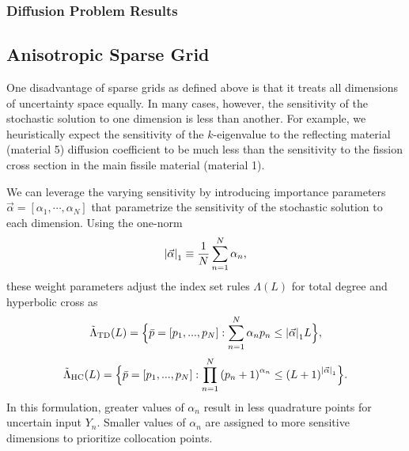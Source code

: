 \documentclass{mc2015}
\begin{document}
\subsubsection{Diffusion Problem Results}



\subsection{Anisotropic Sparse Grid}
One disadvantage of sparse grids as defined above is that it treats all dimensions of uncertainty space equally.  In many cases, however, the sensitivity of the stochastic solution to one dimension is less than another.  For example, we heuristically expect the sensitivity of the $k$-eigenvalue to the reflecting material (material 5) diffusion coefficient to be much less than the sensitivity to the fission cross section in the main fissile material (material 1).  

We can leverage the varying sensitivity by introducing importance parameters $\vec\alpha=[\alpha_1,\cdots,\alpha_N]$ that parametrize the sensitivity of the stochastic solution to each dimension.  Using the one-norm
\begin{equation}
\qty|\vec\alpha|_1\equiv\frac{1}{N}\sum_{n=1}^N \alpha_n,
\end{equation}
these weight parameters adjust the index set rules $\Lambda(L)$ for total degree and hyperbolic cross as
\begin{equation}
\tilde\Lambda_\text{TD}(L)=\Big\{\bar p=[p_1,...,p_N]:\sum_{n=1}^N \alpha_n p_n \leq \qty|\vec\alpha|_1 L \Big\},
\end{equation}
\begin{equation}
\tilde\Lambda_\text{HC}(L)=\Big\{\bar p=[p_1,...,p_N]:\prod_{n=1}^N \qty(p_n+1)^{\alpha_n} \leq \qty(L+1)^{\qty|\vec\alpha|_1} \Big\}.
\end{equation}
In this formulation, greater values of $\alpha_n$ result in less quadrature points for uncertain input $Y_n$.  Smaller values of $\alpha_n$ are assigned to more sensitive dimensions to prioritize collocation points.
\end{document}
